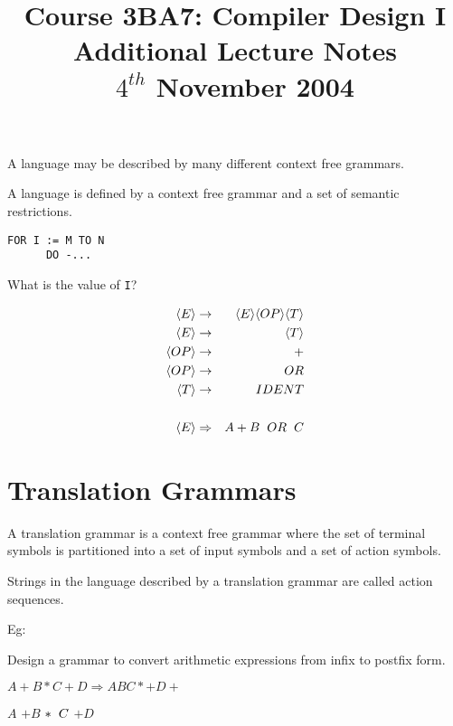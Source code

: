 \documentclass[a4paper,12pt]{article}
\newcommand{\actionsym}[1]{{\color{Emerald}{\{$#1$\}}}}
\begin{document}
\title{Course 3BA7: Compiler Design I \\ Additional Lecture Notes \\ $4^{th}$ November 2004}

\maketitle

A language may be described by many different context free grammars.

A language is defined by a context free grammar and a set of semantic
restrictions.


\begin{verbatim}
FOR I := M TO N
      DO -...
\end{verbatim}

What is the value of \verb!I!?


\begin{eqnarray*}
\langle E \rangle		&	\to			& \langle E \rangle \langle OP \rangle \langle T \rangle \\
\langle E \rangle		&	\to			& \langle T \rangle \\
\langle OP \rangle	&	\to			& + \\
\langle OP \rangle	&	\to			& OR \\
\langle T \rangle		&	\to			& IDENT \\
							&					&		\\
\langle E \rangle 	&	\Rightarrow	& A + B  \hspace{2mm} OR \hspace{2mm} C
\end{eqnarray*}

\section*{Translation Grammars}

A translation grammar is a context free grammar where the set of
terminal symbols is partitioned into a set of input symbols and a set of
action symbols.

Strings in the language described by a translation grammar are called
action sequences.

Eg:

Design a grammar to convert arithmetic expressions from infix to postfix
form.

$A + B \ast C + D \Rightarrow ABC \ast + D +$

$A$ \actionsym{A} $+ B$ \actionsym{B} $ \ast \hspace{2mm} C $
\actionsym{C} \actionsym{\ast} \actionsym{+} $+ D$
\actionsym{D} \actionsym{+}
\end{document}
